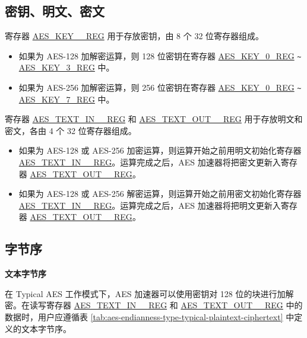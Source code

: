 \documentclass[main\_\_CN.tex]{subfiles}
\begin{document}
\subsection{密钥、明文、密文}

寄存器 \hyperref[regdesc:AESKEYnREG]{AES\_KEY\_\_REG} 用于存放密钥，由 8 个 32 位寄存器组成。

\begin{itemize}
    \item 如果为 AES-128 加解密运算，则 128 位密钥在寄存器 \hyperref[regdesc:AESKEYnREG]{AES\_KEY\_0\_REG} \verb+~+ \hyperref[regdesc:AESKEYnREG]{AES\_KEY\_3\_REG} 中。
    \item 如果为 AES-256 加解密运算，则 256 位密钥在寄存器 \hyperref[regdesc:AESKEYnREG]{AES\_KEY\_0\_REG} \verb+~+ \hyperref[regdesc:AESKEYnREG]{AES\_KEY\_7\_REG} 中。
\end{itemize}

寄存器 \hyperref[regdesc:AESTEXTINnREG]{AES\_TEXT\_IN\_\_REG} 和 \hyperref[regdesc:AESTEXTOUTnREG]{AES\_TEXT\_OUT\_\_REG} 用于存放明文和密文，各由 4 个 32 位寄存器组成。

\begin{itemize}
    \item 如果为 AES-128 或 AES-256 加密运算，则运算开始之前用明文初始化寄存器 \hyperref[regdesc:AESTEXTINnREG]{AES\_TEXT\_IN\_\_REG}。运算完成之后，AES 加速器将把密文更新入寄存器 \hyperref[regdesc:AESTEXTOUTnREG]{AES\_TEXT\_OUT\_\_REG}。
    \item 如果为 AES-128 或 AES-256 解密运算，则运算开始之前用密文初始化寄存器 \hyperref[regdesc:AESTEXTINnREG]{AES\_TEXT\_IN\_\_REG}。运算完成之后，AES 加速器将把明文更新入寄存器 \hyperref[regdesc:AESTEXTOUTnREG]{AES\_TEXT\_OUT\_\_REG}。
\end{itemize}

\subsection{字节序}

\textbf{文本字节序}

在 Typical AES 工作模式下，AES 加速器可以使用密钥对 128 位的块进行加解密。在读写寄存器 \hyperref[regdesc:AESTEXTINnREG]{AES\_TEXT\_IN\_\_REG} 和 \hyperref[regdesc:AESTEXTINnREG]{AES\_TEXT\_OUT\_\_REG} 中的数据时，用户应遵循表 \ref{tab:aes-endianness-type-typical-plaintext-ciphertext} 中定义的文本字节序。

\end{document}
